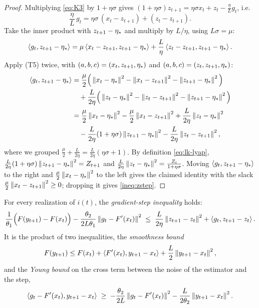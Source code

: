 \begin{proof}
Multiplying \eqref{eq:K3} by $1+\eta\sigma$ gives $(1+\eta\sigma)z_{t+1}=\eta\sigma x_t+z_t-\frac\eta L g_t$, i.e.
\begin{equation*}
\frac\eta L\,g_t=\eta\sigma\,(x_t-z_{t+1})+(z_t-z_{t+1}).
\end{equation*}
Take the inner product with $z_{t+1}-\eta_\ast$ and multiply by $L/\eta$, using $L\sigma=\mu$:
\begin{equation*}
\left\langle g_t, z_{t+1}-\eta_\ast \right\rangle=\mu\left\langle x_t-z_{t+1}, z_{t+1}-\eta_\ast \right\rangle+\frac L\eta\left\langle z_t-z_{t+1}, z_{t+1}-\eta_\ast \right\rangle.
\end{equation*}
Apply (T5) twice, with $(a,b,c)=(x_t,z_{t+1},\eta_\ast)$ and $(a,b,c)=(z_t,z_{t+1},\eta_\ast)$:
\begin{align*}
\left\langle g_t, z_{t+1}-\eta_\ast \right\rangle&=\frac\mu2\Big(\left\|x_t-\eta_\ast\right\|^2-\left\|x_t-z_{t+1}\right\|^2-\left\|z_{t+1}-\eta_\ast\right\|^2\Big)\\
&\quad+\frac L{2\eta}\Big(\left\|z_t-\eta_\ast\right\|^2-\left\|z_t-z_{t+1}\right\|^2-\left\|z_{t+1}-\eta_\ast\right\|^2\Big)\\
&=\frac\mu2\left\|x_t-\eta_\ast\right\|^2-\frac\mu2\left\|x_t-z_{t+1}\right\|^2+\frac L{2\eta}\left\|z_t-\eta_\ast\right\|^2\\
&\quad-\frac L{2\eta}(1+\eta\sigma)\left\|z_{t+1}-\eta_\ast\right\|^2-\frac L{2\eta}\left\|z_t-z_{t+1}\right\|^2,
\end{align*}
where we grouped $\frac\mu2+\frac L{2\eta}=\frac L{2\eta}(\eta\sigma+1)$. By definition \eqref{eq:lk-lyap}, $\frac L{2\eta}(1+\eta\sigma)\left\|z_{t+1}-\eta_\ast\right\|^2=Z_{t+1}$ and $\frac L{2\eta}\left\|z_t-\eta_\ast\right\|^2=\frac{Z_t}{1+\eta\sigma}$. Moving $\left\langle g_t, z_{t+1}-\eta_\ast \right\rangle$ to the right and $\frac\mu2\left\|x_t-\eta_\ast\right\|^2$ to the left gives the claimed identity with the slack $\frac\mu2\left\|x_t-z_{t+1}\right\|^2\ge0$; dropping it gives \eqref{ineq:zstep}.
\end{proof}

\begin{lemma}\label{lem:L3}
For every realization of $i(t)$, the \emph{gradient-step inequality} holds:
\begin{equation}\label{ineq:ystep}
\frac1{\theta_1}\Big(F(y_{t+1})-F(x_t)\Big)-\frac{\theta_2}{2L\theta_1}\left\|g_t-F'(x_t)\right\|^2\;\le\;\frac L{2\eta}\left\|z_{t+1}-z_t\right\|^2+\left\langle g_t, z_{t+1}-z_t \right\rangle.
\end{equation}
It is the product of two inequalities, the \emph{smoothness bound}
\begin{equation}\label{ineq:ystep-smooth}
F(y_{t+1})\le F(x_t)+\left\langle F'(x_t), y_{t+1}-x_t \right\rangle+\frac L2\left\|y_{t+1}-x_t\right\|^2,
\end{equation}
and the \emph{Young bound} on the cross term between the noise of the estimator and the step,
\begin{equation}\label{ineq:ystep-young}
\left\langle g_t-F'(x_t), y_{t+1}-x_t \right\rangle\;\ge\;-\frac{\theta_2}{2L}\left\|g_t-F'(x_t)\right\|^2-\frac L{2\theta_2}\left\|y_{t+1}-x_t\right\|^2.
\end{equation}
\end{lemma}

